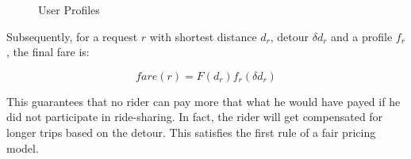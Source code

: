 \begin{figure}
	\centering
	\vspace{-0mm}\caption{User Profiles} \vspace{-2mm} \label{fig:profiles}
\end{figure}\vspace{-0mm}

Subsequently, for a request $r$ with shortest distance $d_r$, detour $\delta d_r$ and a profile $f_r$, the final fare is:

\begin{equation}
\label{eq:fare}
fare(r) = F(d_r) f_r(\delta d_r)
\end{equation}

\noindent This guarantees that no rider can pay more that what he would have payed if he did not participate in ride-sharing. In fact, the rider will get compensated for longer trips based on the detour. This satisfies the first rule of a fair pricing model.

